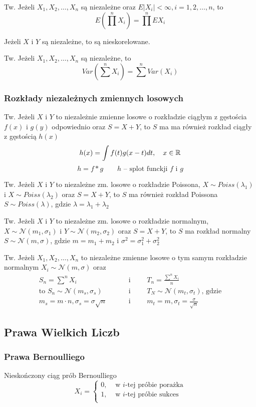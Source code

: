\documentclass[../Matematyka.tex]{subfiles}
\begin{document}
Tw. Jeżeli \(X_1, X_2, \ldots, X_n\) są niezależne oraz \(E|X_i|<\infty, i = 1, 2, \ldots, n\), to
\[E(\prod^n X_i) = \prod^n EX_i\]

Jeżeli \(X\) i \(Y\) są niezależne, to są nieskorelowane.

Tw. Jeżeli \(X_1, X_2, \ldots, X_n\) są niezależne, to
\[Var(\sum^n X_i) = \sum^n Var(X_i)\]

\subsubsection{Rozkłady niezależnych zmiennych losowych}
Tw. Jeżeli \(X\) i \(Y\) to niezależnie zmienne losowe o rozkładzie ciągłym z gęstościa \(f(x)\) i \(g(y)\) odpowiednio oraz \(S = X + Y\), to \(S\) ma ma również rozkład ciągły z gęstością \(h(x)\)
\[h(x) = \int f(t)g(x-t)dt, \quad x \in \mathbb{R}\]
\[h = f * g \qquad h \text{ -- splot funckji } f \text{ i } g\]

Tw. Jeżeli \(X\) i \(Y\) to niezależne zm. losowe o rozkładzie Poissona, \(X \sim Poiss(\lambda_1)\) i \(X \sim Poiss(\lambda_2)\) oraz \(S = X + Y\), to \(S\) ma również rozkład Poissona \(S \sim Poiss(\lambda)\), gdzie \(\lambda = \lambda_1 + \lambda_2\)

Tw. Jeżeli \(X\) i \(Y\) to niezależne zm. losowe o rozkładzie normalnym, \(X \sim \mathcal{N} (m_1, \sigma_1)\) i \(Y \sim \mathcal{N} (m_2, \sigma_2)\) oraz \(S = X + Y\), to \(S\) ma rozkład normalny \(S \sim \mathcal{N} (m, \sigma)\), gdzie \(m = m_1 + m_2\) i \(\sigma^2 = \sigma_1^2 + \sigma_2^2\)

Tw. Jeżeli \(X_1, X_2, \ldots, X_n\) to niezależne zmienne losowe o tym samym rozkładzie normalnym \(X_i \sim \mathcal{N} (m, \sigma)\) oraz
\begin{align*}
    S_n = \sum^n X_i \qquad& \text{ i }\qquad T_n = \frac{\displaystyle\sum^n X_i}{n}\\
    \text{to } S_n \sim \mathcal{N}(m_s, \sigma_s) \qquad& \text{ i } \qquad T_N \sim \mathcal{N} (m_t, \sigma_t) \text{, gdzie}\\
    m_s = m \cdot n, \sigma_s = \sigma\sqrt{n} \qquad& \text{ i } \qquad m_t=m, \sigma_t=\frac{\sigma}{\sqrt{n}}
\end{align*}

\newpage
\subsection{Prawa Wielkich Liczb}
\subsubsection{Prawa Bernoulliego}
Nieskończony ciąg prób Bernoulliego
\[X_i = \begin{cases}
    0,& \text{ w } i\text{-tej próbie porażka}\\
    1,& \text{ w } i\text{-tej próbie sukces}\\
\end{cases}\]
\end{document}
